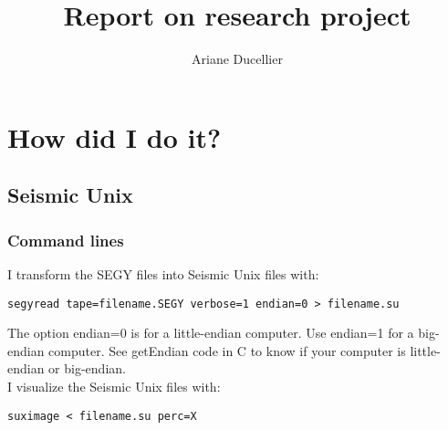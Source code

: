 \documentclass{article}
\title{Report on research project}
\author{Ariane Ducellier}
\begin{document}
\maketitle

\section{How did I do it?}

\subsection{Seismic Unix}

\subsubsection{Command lines}

I transform the SEGY files into Seismic Unix files with:

\begin{verbatim}
segyread tape=filename.SEGY verbose=1 endian=0 > filename.su
\end{verbatim}

The option endian=0 is for a little-endian computer. Use endian=1 for a big-endian computer. See getEndian code in C to know if your computer is little-endian or big-endian.\\

I visualize the Seismic Unix files with:

\begin{verbatim}
suximage < filename.su perc=X
\end{verbatim}
\end{document}
